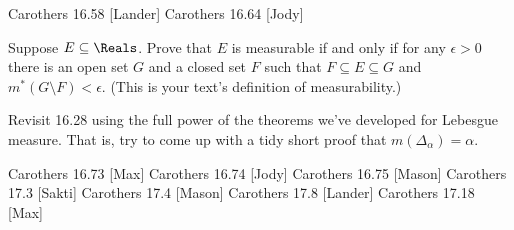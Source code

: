 \documentclass[minion]{homework}
\begin{document}
\begin{aproblems}


\hproblem Carothers 16.58 [Lander]
\hproblem Carothers 16.64 [Jody]

\hproblem [Sakti]

Suppose $E\subseteq \Reals$.  Prove that $E$ is measurable
if and only if for any $\epsilon>0$ there is an open set $G$ and a closed 
set $F$ such that $F\subseteq E\subseteq G$ and $m^*(G\setminus F)<\epsilon$.
(This is your text's definition of measurability.)

\hproblem [Mason]

Revisit 16.28 using the full power of the theorems we've developed for
Lebesgue measure.  That is, try to come up with a tidy short proof that $m(\Delta_\alpha)=\alpha$.

\hproblem Carothers 16.73 [Max]
\hproblem Carothers 16.74 [Jody]
\hproblem Carothers 16.75 [Mason]
\hproblem Carothers 17.3 [Sakti]
\hproblem Carothers 17.4 [Mason]
\hproblem Carothers 17.8 [Lander]
\hproblem Carothers 17.18 [Max]

\end{aproblems}
\end{document}
